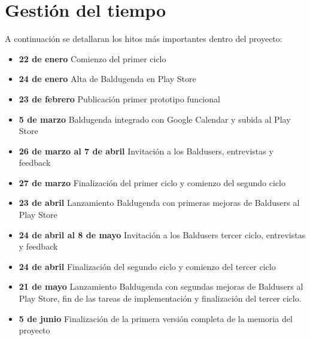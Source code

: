 \section{Gestión del tiempo}
\label{secc:Gestión del tiempo}

A continuación se detallaran los hitos más importantes dentro del proyecto:

\begin{itemize}
	\item \textbf{22 de enero} Comienzo del primer ciclo
	\item \textbf{24 de enero} Alta de Baldugenda en Play Store
	\item \textbf{23 de febrero} Publicación primer prototipo funcional
	\item \textbf{5 de marzo} Baldugenda integrado con Google Calendar y subida al Play Store
	\item \textbf{26 de marzo al 7 de abril} Invitación a los Baldusers, entrevistas y feedback
	\item \textbf{27 de marzo} Finalización del primer ciclo y comienzo del segundo ciclo
	\item \textbf{23 de abril} Lanzamiento Baldugenda con primeras mejoras de Baldusers al Play Store
	\item \textbf{24 de abril al 8 de mayo} Invitación a los Baldusers tercer ciclo, entrevistas y feedback
	\item \textbf{24 de abril} Finalización del segundo ciclo y comienzo del tercer ciclo
	\item \textbf{21 de mayo} Lanzamiento Baldugenda con segundas mejoras de Baldusers al Play Store, fin de las tareas de implementación y finalización del tercer ciclo.
	\item \textbf{5 de junio} Finalización de la primera versión completa de la memoria del proyecto
\end{itemize}